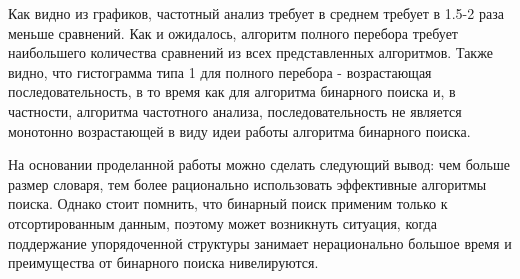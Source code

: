 Как видно из графиков, частотный анализ требует в среднем тре­бует в 1.5-2 раза меньше сравнений. Как и ожидалось, алгоритм полного перебора требует наибольшего количества сравнений из всех представ­ленных алгоритмов.
Также видно, что гистограмма типа 1 для полного перебора - воз­растающая последовательность, в то время как для алгоритма бинарно­го поиска и, в частности, алгоритма частотного анализа, последователь­ность не является монотонно возрастающей в виду идеи работы алгорит­ма бинарного поиска.

На основании проделанной работы можно сделать следующий вы­вод: чем больше размер словаря, тем более рационально использовать эффективные алгоритмы поиска. Однако стоит помнить, что бинарный поиск применим только к отсортированным данным, поэтому может воз­никнуть ситуация, когда поддержание упорядоченной структуры занима­ет нерационально большое время и преимущества от бинарного поиска нивелируются.